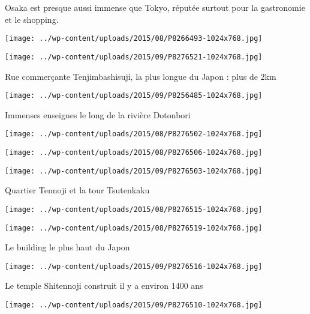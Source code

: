  \newline
 Osaka est presque aussi immense que Tokyo, réputée surtout pour la gastronomie et le shopping. \newline
 \newline
\centerline{\texttt{[image: ../wp-content/uploads/2015/08/P8266493-1024x768.jpg]} } 
 \newline
 \newline
\centerline{\texttt{[image: ../wp-content/uploads/2015/09/P8276521-1024x768.jpg]} } 
 \newline
 Rue commerçante Tenjimbashisuji, la plus longue du Japon : plus de 2km \newline
 \newline
\centerline{\texttt{[image: ../wp-content/uploads/2015/09/P8256485-1024x768.jpg]} } 
 \newline
 Immenses enseignes le long de la rivière Dotonbori \newline
 \newline
\centerline{\texttt{[image: ../wp-content/uploads/2015/08/P8276502-1024x768.jpg]} } 
 \newline
 \newline
\centerline{\texttt{[image: ../wp-content/uploads/2015/08/P8276506-1024x768.jpg]} } 
 \newline
 \newline
\centerline{\texttt{[image: ../wp-content/uploads/2015/09/P8276503-1024x768.jpg]} } 
 \newline
 Quartier Tennoji et la tour Tsutenkaku \newline
 \newline
\centerline{\texttt{[image: ../wp-content/uploads/2015/08/P8276515-1024x768.jpg]} } 
 \newline
 \newline
\centerline{\texttt{[image: ../wp-content/uploads/2015/08/P8276519-1024x768.jpg]} } 
 \newline
 Le building le plus haut du Japon \newline
 \newline
\centerline{\texttt{[image: ../wp-content/uploads/2015/09/P8276516-1024x768.jpg]} } 
 \newline
 Le temple Shitennoji construit il y a environ 1400 ans \newline
 \newline
\centerline{\texttt{[image: ../wp-content/uploads/2015/09/P8276510-1024x768.jpg]} } 
